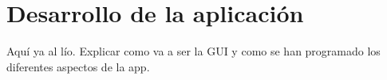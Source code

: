 \chapter{Desarrollo de la aplicación}

{\color{red} Aquí ya al lío. Explicar como va a ser la GUI y como se han programado los diferentes aspectos de la app.}